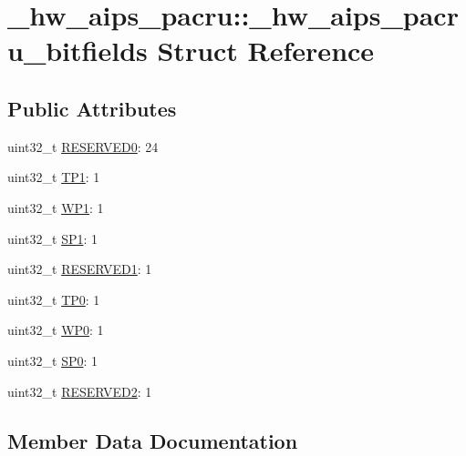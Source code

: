 \hypertarget{struct__hw__aips__pacru_1_1__hw__aips__pacru__bitfields}{}\section{\+\_\+hw\+\_\+aips\+\_\+pacru\+:\+:\+\_\+hw\+\_\+aips\+\_\+pacru\+\_\+bitfields Struct Reference}
\label{struct__hw__aips__pacru_1_1__hw__aips__pacru__bitfields}
\subsection*{Public Attributes}
\begin{DoxyCompactItemize}
\item 
uint32\+\_\+t \hyperlink{struct__hw__aips__pacru_1_1__hw__aips__pacru__bitfields_a52c3ac15b3f531487f7e4432375b1454}{R\+E\+S\+E\+R\+V\+E\+D0}\+: 24
\item 
uint32\+\_\+t \hyperlink{struct__hw__aips__pacru_1_1__hw__aips__pacru__bitfields_a64e0aad6255be887bf96f100c815962c}{T\+P1}\+: 1
\item 
uint32\+\_\+t \hyperlink{struct__hw__aips__pacru_1_1__hw__aips__pacru__bitfields_a4e87d9ab6566083015b83d6a8119ff55}{W\+P1}\+: 1
\item 
uint32\+\_\+t \hyperlink{struct__hw__aips__pacru_1_1__hw__aips__pacru__bitfields_ab91e15d52054b5dbc43a91db65581130}{S\+P1}\+: 1
\item 
uint32\+\_\+t \hyperlink{struct__hw__aips__pacru_1_1__hw__aips__pacru__bitfields_a9f2fc09c25fd5c8d9bfd272bf65499f0}{R\+E\+S\+E\+R\+V\+E\+D1}\+: 1
\item 
uint32\+\_\+t \hyperlink{struct__hw__aips__pacru_1_1__hw__aips__pacru__bitfields_a73f7aa7dddbd2ff62014904f53f3e01a}{T\+P0}\+: 1
\item 
uint32\+\_\+t \hyperlink{struct__hw__aips__pacru_1_1__hw__aips__pacru__bitfields_a600af1f060763e1d6182e7944c9fa8d5}{W\+P0}\+: 1
\item 
uint32\+\_\+t \hyperlink{struct__hw__aips__pacru_1_1__hw__aips__pacru__bitfields_ae5d3df99f761b99854837cf2b4fc3a8e}{S\+P0}\+: 1
\item 
uint32\+\_\+t \hyperlink{struct__hw__aips__pacru_1_1__hw__aips__pacru__bitfields_a53a94277aa153cfd23fbef2713d21ba3}{R\+E\+S\+E\+R\+V\+E\+D2}\+: 1
\end{DoxyCompactItemize}


\subsection{Member Data Documentation}

